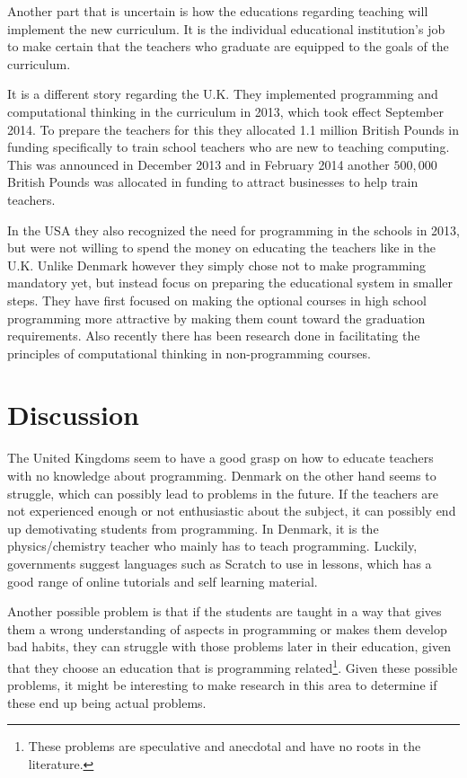 Another part that is uncertain is how the educations regarding teaching will implement the new curriculum. It is the individual educational institution's job to make certain that the teachers who graduate are equipped to the goals of the curriculum\cite{dk_programming_article}. 

It is a different story regarding the U.K. They implemented programming and computational thinking in the curriculum in 2013, which took effect September 2014\cite{bbc_technology}. To prepare the teachers for this they allocated 1.1 million British Pounds in funding specifically to train school teachers who are new to teaching computing\cite{uk_computing}. This was announced in December 2013 and in February 2014 another $500,000$ British Pounds was allocated in funding to attract businesses to help train teachers\cite{theguardian}.

In the USA they also recognized the need for programming in the schools in 2013\cite{Obama}, but were not willing to spend the money on educating the teachers like in the U.K.
Unlike Denmark however they simply chose not to make programming mandatory yet, but instead focus on preparing the educational system in smaller steps.
They have first focused on making the optional courses in high school programming more attractive by making them count toward the graduation requirements\cite{Code_credit}.
Also recently there has been research done in facilitating the principles of computational thinking in non-programming courses\cite{comp_thinking}.

\section{Discussion}
The United Kingdoms seem to have a good grasp on how to educate teachers with no knowledge about programming. Denmark on the other hand seems to struggle, which can possibly lead to problems in the future. If the teachers are not experienced enough or not enthusiastic about the subject, it can possibly end up demotivating students from programming. In Denmark, it is the physics/chemistry teacher who mainly has to teach programming. Luckily, governments suggest languages such as Scratch to use in lessons, which has a good range of online tutorials and self learning material.

Another possible problem is that if the students are taught in a way that gives them a wrong understanding of aspects in programming or makes them develop bad habits, they can struggle with those problems later in their education, given that they choose an education that is programming related\footnote{These problems are speculative and anecdotal and have no roots in the literature.}. Given these possible problems, it might be interesting to make research in this area to determine if these end up being actual problems.

